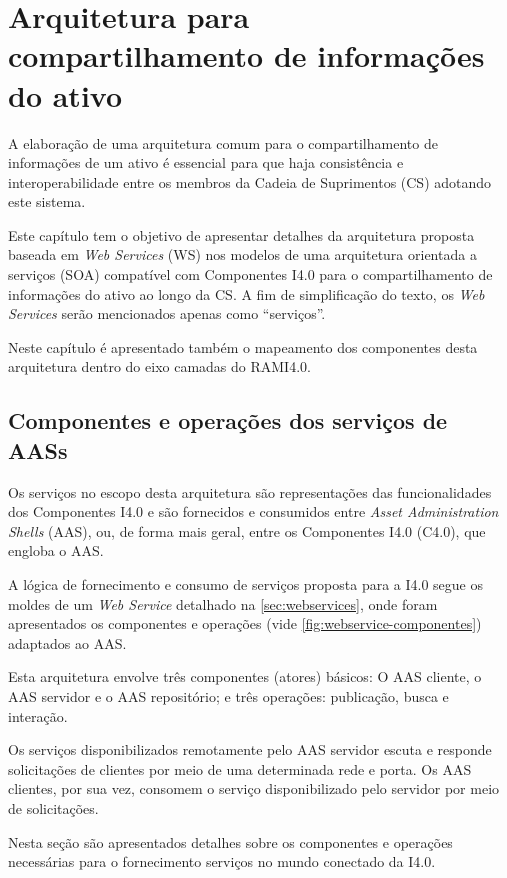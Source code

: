 \chapter{Arquitetura para compartilhamento de informações do ativo}
\label{cha:arquitetura}

A elaboração de uma arquitetura comum para o compartilhamento de informações de um ativo é essencial para que haja consistência e interoperabilidade entre os membros da Cadeia de Suprimentos (CS) adotando este sistema.

Este capítulo tem o objetivo de apresentar detalhes da arquitetura proposta baseada em \textit{Web Services} (WS) nos modelos de uma arquitetura orientada a serviços (SOA) compatível com Componentes I4.0 para o compartilhamento de informações do ativo ao longo da CS. A fim de simplificação do texto, os \textit{Web Services} serão mencionados apenas como ``serviços''.

Neste capítulo é apresentado também o mapeamento dos componentes desta arquitetura dentro do eixo camadas do RAMI4.0.

\section{Componentes e operações dos serviços de AASs}

Os serviços no escopo desta arquitetura são representações das funcionalidades dos Componentes I4.0 e são fornecidos e consumidos entre \textit{Asset Administration Shells} (AAS), ou, de forma mais geral, entre os Componentes I4.0 (C4.0), que engloba o AAS.

A lógica de fornecimento e consumo de serviços proposta para a I4.0 segue os moldes de um \textit{Web Service} detalhado na \autoref{sec:webservices}, onde foram apresentados os componentes e operações (vide \autoref{fig:webservice-componentes}) adaptados ao AAS.

Esta arquitetura envolve três componentes (atores) básicos: O AAS cliente, o AAS servidor e o AAS repositório; e três operações: publicação, busca e interação.

Os serviços disponibilizados remotamente pelo AAS servidor escuta e responde solicitações de clientes por meio de uma determinada rede e porta. Os AAS clientes, por sua vez, consomem o serviço disponibilizado pelo servidor por meio de solicitações.

Nesta seção são apresentados detalhes sobre os componentes e operações necessárias para o fornecimento serviços no mundo conectado da I4.0.

